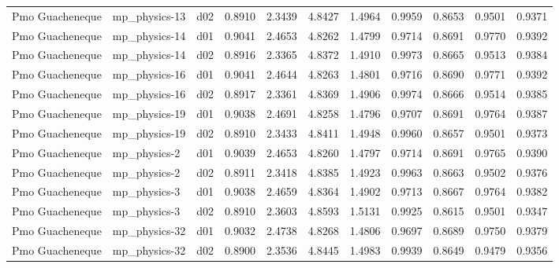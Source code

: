 \begin{longtable}{lllrrrrrrrr}
      Pmo Guacheneque  &         mp\_physics-13 &     d02 &   0.8910 &   2.3439 &   4.8427 &       1.4964 &        0.9959 &       0.8653 &           0.9501 &  0.9371 \\
      Pmo Guacheneque  &         mp\_physics-14 &     d01 &   0.9041 &   2.4653 &   4.8262 &       1.4799 &        0.9714 &       0.8691 &           0.9770 &  0.9392 \\
      Pmo Guacheneque  &         mp\_physics-14 &     d02 &   0.8916 &   2.3365 &   4.8372 &       1.4910 &        0.9973 &       0.8665 &           0.9513 &  0.9384 \\
      Pmo Guacheneque  &         mp\_physics-16 &     d01 &   0.9041 &   2.4644 &   4.8263 &       1.4801 &        0.9716 &       0.8690 &           0.9771 &  0.9392 \\
      Pmo Guacheneque  &         mp\_physics-16 &     d02 &   0.8917 &   2.3361 &   4.8369 &       1.4906 &        0.9974 &       0.8666 &           0.9514 &  0.9385 \\
      Pmo Guacheneque  &         mp\_physics-19 &     d01 &   0.9038 &   2.4691 &   4.8258 &       1.4796 &        0.9707 &       0.8691 &           0.9764 &  0.9387 \\
      Pmo Guacheneque  &         mp\_physics-19 &     d02 &   0.8910 &   2.3433 &   4.8411 &       1.4948 &        0.9960 &       0.8657 &           0.9501 &  0.9373 \\
      Pmo Guacheneque  &          mp\_physics-2 &     d01 &   0.9039 &   2.4653 &   4.8260 &       1.4797 &        0.9714 &       0.8691 &           0.9765 &  0.9390 \\
      Pmo Guacheneque  &          mp\_physics-2 &     d02 &   0.8911 &   2.3418 &   4.8385 &       1.4923 &        0.9963 &       0.8663 &           0.9502 &  0.9376 \\
      Pmo Guacheneque  &          mp\_physics-3 &     d01 &   0.9038 &   2.4659 &   4.8364 &       1.4902 &        0.9713 &       0.8667 &           0.9764 &  0.9382 \\
      Pmo Guacheneque  &          mp\_physics-3 &     d02 &   0.8910 &   2.3603 &   4.8593 &       1.5131 &        0.9925 &       0.8615 &           0.9501 &  0.9347 \\
      Pmo Guacheneque  &         mp\_physics-32 &     d01 &   0.9032 &   2.4738 &   4.8268 &       1.4806 &        0.9697 &       0.8689 &           0.9750 &  0.9379 \\
      Pmo Guacheneque  &         mp\_physics-32 &     d02 &   0.8900 &   2.3536 &   4.8445 &       1.4983 &        0.9939 &       0.8649 &           0.9479 &  0.9356 \\

\end{longtable}
